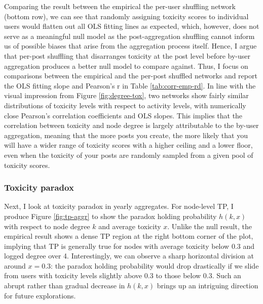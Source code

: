 \documentclass[10pt,twocolumn,letterpaper]{article}
\begin{document}
Comparing the result between the empirical the per-user shuffling network (bottom row), we can see that randomly assigning toxicity scores to individual users would flatten out all OLS fitting lines as expected, which, however, does not serve as a meaningful null model as the post-aggregation shuffling cannot inform us of possible biases that arise from the aggregation process itself. Hence, I argue that per-post shuffling that disarranges toxicity at the post level before by-user aggregation produces a better null model to compare against. Thus, I focus on comparisons between the empirical and the per-post shuffled networks and report the OLS fitting slope and Pearson's r in Table \ref{tab:corr-emp-rd}. In line with the visual impression from Figure \ref{fig:degree-tox}, two networks show fairly similar distributions of toxicity levels with respect to activity levels, with numerically close Pearson's correlation coefficients and OLS slopes. This implies that the correlation between toxicity and node degree is largely attributable to the by-user aggregation, meaning that the more posts you create, the more likely that you will have a wider range of toxicity scores with a higher ceiling and a lower floor, even when the toxicity of your posts are randomly sampled from a given pool of toxicity scores. 

\subsubsection{Toxicity paradox}

Next, I look at toxicity paradox in yearly aggregates. For node-level TP, I produce Figure \ref{fig:tp-aggr} to show the paradox holding probability $h(k,x)$ with respect to node degree $k$ and average toxicity $x$. Unlike the null result, the empirical result shows a dense TP region at the right bottom corner of the plot, implying that TP is generally true for nodes with average toxicity below 0.3 and logged degree over 4. Interestingly, we can observe a sharp horizontal division at around $x=0.3$: the paradox holding probability would drop drastically if we slide from users with toxicity levels slightly above 0.3 to those below 0.3. Such an abrupt rather than gradual decrease in $h(k,x)$ brings up an intriguing direction for future explorations. 
\end{document}
